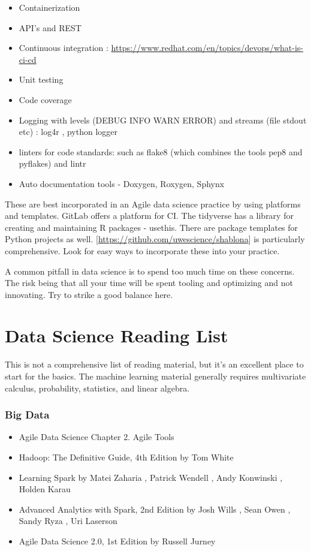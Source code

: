 \documentclass[
  11pt,
]{book}
\providecommand{\tightlist}{%
  \setlength{\itemsep}{0pt}\setlength{\parskip}{0pt}}
\begin{document}
\begin{itemize}
\tightlist
\item
  Containerization
\item
  API's and REST
\item
  Continuous integration : \url{https://www.redhat.com/en/topics/devops/what-is-ci-cd}
\item
  Unit testing
\item
  Code coverage
\item
  Logging with levels (DEBUG INFO WARN ERROR) and streams (file stdout etc) : log4r , python logger\\
\item
  linters for code standards: such as flake8 (which combines the tools pep8 and pyflakes) and lintr
\item
  Auto documentation tools - Doxygen, Roxygen, Sphynx
\end{itemize}

These are best incorporated in an Agile data science practice by using platforms and templates. GitLab offers a platform for CI. The tidyverse has a library for creating and maintaining R packages - usethis. There are package templates for Python projects as well.
{[}\url{https://github.com/uwescience/shablona}{]}
is particularly comprehensive. Look for easy ways to incorporate these into your practice.

A common pitfall in data science is to spend too much time on these concerns. The risk being that all your time will be spent tooling and optimizing and not innovating. Try to strike a good balance here.

\hypertarget{data-science-reading-list}{%
\chapter{Data Science Reading List}\label{data-science-reading-list}}

This is not a comprehensive list of reading material, but it's an excellent place to start for the basics. The machine learning material generally requires multivariate calculus, probability, statistics, and linear algebra.

\hypertarget{big-data}{%
\subsection{Big Data}\label{big-data}}

\begin{itemize}
\tightlist
\item
  Agile Data Science Chapter 2. Agile Tools
\item
  Hadoop: The Definitive Guide, 4th Edition by Tom White
\item
  Learning Spark by Matei Zaharia , Patrick Wendell , Andy Konwinski , Holden Karau
\item
  Advanced Analytics with Spark, 2nd Edition by Josh Wills , Sean Owen , Sandy Ryza , Uri Laserson
\item
  Agile Data Science 2.0, 1st Edition by Russell Jurney
\end{itemize}
\end{document}
